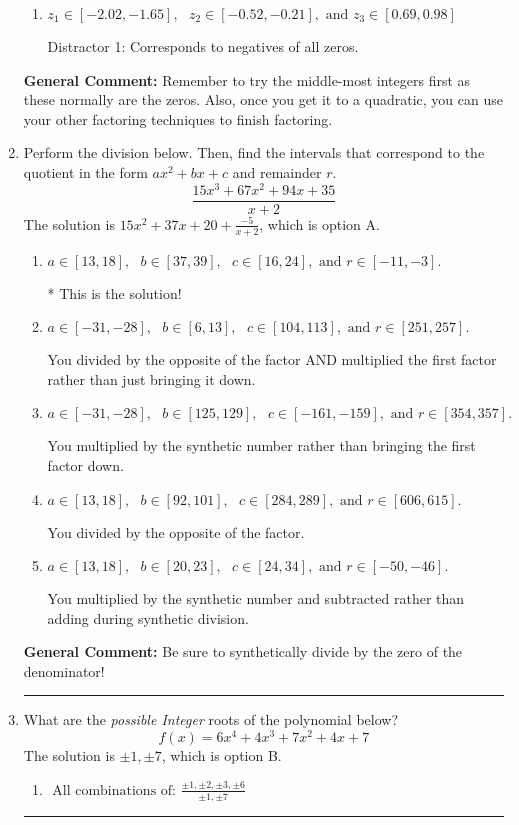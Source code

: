 \documentclass{extbook}[14pt]
\newcommand{\litem}[1]{\item #1

\rule{\textwidth}{0.4pt}}
\begin{document}
\begin{enumerate}
{\begin{enumerate}[label=\Alph*.]
 Distractor 3: Corresponds to negatives of all zeros AND inversing rational roots.
\item \( z_1 \in [-2.02, -1.65], \text{   }  z_2 \in [-0.52, -0.21], \text{   and   } z_3 \in [0.69, 0.98] \)

 Distractor 1: Corresponds to negatives of all zeros.
\end{enumerate}

\textbf{General Comment:} Remember to try the middle-most integers first as these normally are the zeros. Also, once you get it to a quadratic, you can use your other factoring techniques to finish factoring.
}
\litem{
Perform the division below. Then, find the intervals that correspond to the quotient in the form $ax^2+bx+c$ and remainder $r$.
\[ \frac{15x^{3} +67 x^{2} +94 x + 35}{x + 2} \]The solution is \( 15x^{2} +37 x + 20 + \frac{-5}{x + 2} \), which is option A.\begin{enumerate}[label=\Alph*.]
\item \( a \in [13, 18], \text{   } b \in [37, 39], \text{   } c \in [16, 24], \text{   and   } r \in [-11, -3]. \)

* This is the solution!
\item \( a \in [-31, -28], \text{   } b \in [6, 13], \text{   } c \in [104, 113], \text{   and   } r \in [251, 257]. \)

 You divided by the opposite of the factor AND multiplied the first factor rather than just bringing it down.
\item \( a \in [-31, -28], \text{   } b \in [125, 129], \text{   } c \in [-161, -159], \text{   and   } r \in [354, 357]. \)

 You multiplied by the synthetic number rather than bringing the first factor down.
\item \( a \in [13, 18], \text{   } b \in [92, 101], \text{   } c \in [284, 289], \text{   and   } r \in [606, 615]. \)

 You divided by the opposite of the factor.
\item \( a \in [13, 18], \text{   } b \in [20, 23], \text{   } c \in [24, 34], \text{   and   } r \in [-50, -46]. \)

 You multiplied by the synthetic number and subtracted rather than adding during synthetic division.
\end{enumerate}

\textbf{General Comment:} Be sure to synthetically divide by the zero of the denominator!
}
\litem{
What are the \textit{possible Integer} roots of the polynomial below?
\[ f(x) = 6x^{4} +4 x^{3} +7 x^{2} +4 x + 7 \]The solution is \( \pm 1,\pm 7 \), which is option B.\begin{enumerate}[label=\Alph*.]
\item \( \text{ All combinations of: }\frac{\pm 1,\pm 2,\pm 3,\pm 6}{\pm 1,\pm 7} \)


\end{enumerate}}
\end{enumerate}
\end{document}
